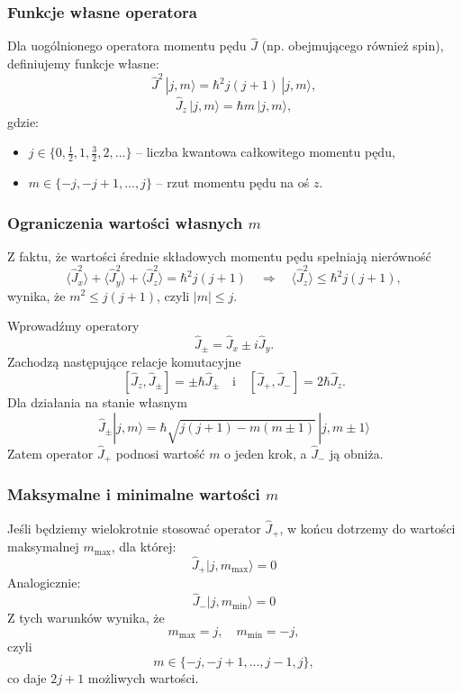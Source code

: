 \subsubsection*{Funkcje własne operatora}
Dla uogólnionego operatora momentu pędu $\hat{J}$ (np. obejmującego również spin), definiujemy funkcje własne:
$$
\hat{J}^2 \, |j, m\rangle = \hbar^2 j(j+1) \, |j, m\rangle,
$$
$$
\hat{J}_z \, |j, m\rangle = \hbar m \, |j, m\rangle,
$$
gdzie:
\begin{itemize}
\item $j \in \{0, \tfrac{1}{2}, 1, \tfrac{3}{2}, 2, \dots \}$ -- liczba kwantowa całkowitego momentu pędu,
\item $m \in \{-j, -j+1, \dots, j\}$ -- rzut momentu pędu na oś $z$.
\end{itemize}
\subsubsection*{Ograniczenia wartości własnych $m$}
Z faktu, że wartości średnie składowych momentu pędu spełniają nierówność
$$
\langle \hat{J}_x^2 \rangle + \langle \hat{J}_y^2 \rangle + \langle \hat{J}_z^2 \rangle = \hbar^2 j(j+1)
\quad \Rightarrow \quad \langle \hat{J}_z^2 \rangle \leq \hbar^2 j(j+1),
$$
wynika, że $m^2 \leq j(j+1)$, czyli $|m| \leq j$.

Wprowadźmy operatory
$$
\hat{J}_\pm = \hat{J}_x \pm i\hat{J}_y.
$$
Zachodzą następujące relacje komutacyjne
$$
[\hat{J}_z, \hat{J}_\pm] = \pm \hbar \hat{J}_\pm
\quad \text{i} \quad
[\hat{J}_+, \hat{J}_-] = 2\hbar \hat{J}_z.
$$
Dla działania na stanie własnym
$$
\hat{J}_\pm |j, m\rangle = \hbar \sqrt{j(j+1) - m(m \pm 1)} \, |j, m \pm 1\rangle
$$
Zatem operator $\hat{J}_+$ podnosi wartość $m$ o jeden krok, a $\hat{J}_-$ ją obniża.

\subsubsection*{Maksymalne i minimalne wartości $m$}
Jeśli będziemy wielokrotnie stosować operator $\hat{J}_+$, w końcu dotrzemy do wartości maksymalnej $m_{\text{max}}$, dla której:
$$
\hat{J}_+ |j, m_{\text{max}}\rangle = 0
$$
Analogicznie:
$$
\hat{J}_- |j, m_{\text{min}}\rangle = 0
$$
Z tych warunków wynika, że
$$
m_{\text{max}} = j, \quad m_{\text{min}} = -j,
$$
czyli
$$
m \in \{-j, -j+1, ..., j-1, j\},
$$
co daje $2j + 1$ możliwych wartości.

